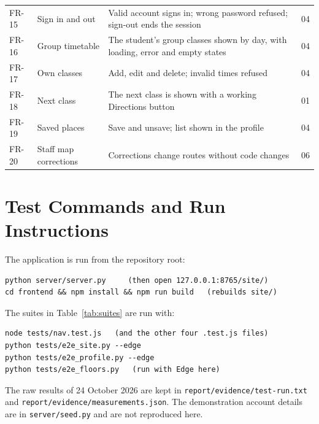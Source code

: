 \documentclass[12pt,a4paper]{report}
\begin{document}
{\begin{longtable}{p{1.3cm}p{5.6cm}p{5.6cm}p{1.4cm}}
FR-15 & Sign in and out & Valid account signs in; wrong password refused; sign-out ends the session & 04 \\
FR-16 & Group timetable & The student's group classes shown by day, with loading, error and empty states & 04 \\
FR-17 & Own classes & Add, edit and delete; invalid times refused & 04 \\
FR-18 & Next class & The next class is shown with a working Directions button & 01 \\
FR-19 & Saved places & Save and unsave; list shown in the profile & 04 \\
FR-20 & Staff map corrections & Corrections change routes without code changes & 06 \\
\end{longtable}}

\chapter{Test Commands and Run Instructions}\label{app:run}
The application is run from the repository root:
\begin{verbatim}
python server/server.py     (then open 127.0.0.1:8765/site/)
cd frontend && npm install && npm run build   (rebuilds site/)
\end{verbatim}
The suites in Table~\ref{tab:suites} are run with:
\begin{verbatim}
node tests/nav.test.js   (and the other four .test.js files)
python tests/e2e_site.py --edge
python tests/e2e_profile.py --edge
python tests/e2e_floors.py   (run with Edge here)
\end{verbatim}
The raw results of 24 October 2026 are kept in \texttt{report/evidence/test-run.txt} and \texttt{report/evidence/measurements.json}. The demonstration account details are in \texttt{server/seed.py} and are not reproduced here.
\end{document}
